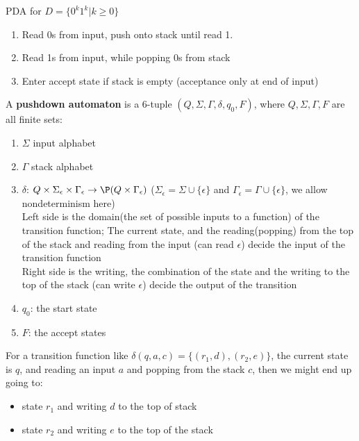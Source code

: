 \begin{example}[PDA]
   PDA for \(D = \{ 0^k1^k|k \geq 0 \} \)  

    \begin{enumerate}
        \item Read 0s from input, push onto stack until read 1.
        \item Read 1s from input, while popping 0s from stack
        \item Enter accept state if stack is empty (acceptance only at end of input)
    \end{enumerate}
\end{example}

\begin{definition}[PDA]
    A \textbf{pushdown automaton} is a 6-tuple \((Q, \Sigma, \Gamma, \delta, q_0, F)\), where \(Q, \Sigma, \Gamma, F \) are all finite sets:
    \begin{enumerate}
        \item \(\Sigma\) input alphabet 
        \item \(\Gamma\) stack alphabet
        \item \(\delta\): \(Q \times \Sigma_\epsilon \times \Gamma_\epsilon \rightarrow \P(Q \times \Gamma_\epsilon)\) (\(\Sigma_\epsilon = \Sigma \cup \{\epsilon\}\) and \(\Gamma_\epsilon = \Gamma \cup \{ \epsilon \} \), we allow nondeterminism here)\\  
        Left side is the domain(the set of possible inputs to a function) of the transition function; The current state, and the reading(popping) from the top of the stack and reading from the input (can read \(\epsilon\)) decide the input of the transition function \\
        Right side is the writing, the combination of the state and the writing to the top of the stack (can write \(\epsilon\)) decide the output of the transition \\
        \item \(q_0\): the start state
        \item \(F\): the accept states  
    \end{enumerate}
    

    For a transition function like \(\delta(q, a, c) = \{(r_1, d), (r_2, e)\} \), the current state is \(q\), and reading an input \(a\) and popping from the stack \(c\), then we might end up going to:
    \begin{itemize}
        \item state \(r_1\) and writing \(d\)  to the top of stack
        \item state \(r_2\) and writing \(e\)  to the top of the stack 
    \end{itemize} 
\end{definition}


